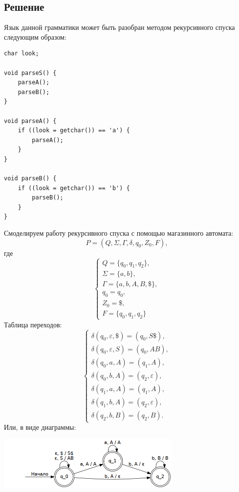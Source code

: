 \documentclass[11pt]{article}
\begin{document}
\subsection{Решение}
\label{sec:org3ea388c}
Язык данной грамматики может быть разобран методом рекурсивного спуска следующим образом:
\begin{verbatim}
char look;

void parseS() {
    parseA();
    parseB();
}

void parseA() {
    if ((look = getchar()) == 'a') {
        parseA();
    }
}

void parseB() {
    if ((look = getchar()) == 'b') {
        parseB();
    }
}
\end{verbatim}
Смоделируем работу рекурсивного спуска с помощью магазинного автомата:
\begin{equation}
P = (Q, \Sigma, \Gamma, \delta, q_0, Z_0, F),
\end{equation}
где
\begin{equation}
\begin{cases}
Q = \{q_0, q_1, q_2\}, \\
\Sigma = \{a, b\}, \\
\Gamma = \{a, b, A, B, \$\}, \\
q_0 = q_0, \\
Z_0 = \$, \\
F = \{q_0, q_1, q_2\}
\end{cases}
\end{equation}
Таблица переходов:
\begin{equation}
\begin{cases}
\delta(q_0, \varepsilon, \$) = (q_0, S\$), \\
\delta(q_0, \varepsilon, S) = (q_0, AB), \\
\delta(q_0, a, A) = (q_1, A), \\
\delta(q_0, b, A) = (q_2, \varepsilon), \\
\delta(q_1, a, A) = (q_1, A), \\
\delta(q_1, b, A) = (q_2, \varepsilon), \\
\delta(q_2, b, B) = (q_2, B).
\end{cases}
\end{equation}
Или, в виде диаграммы:
\begin{center}
\includegraphics[height=100px]{diag4.png}
\end{center}
\end{document}
